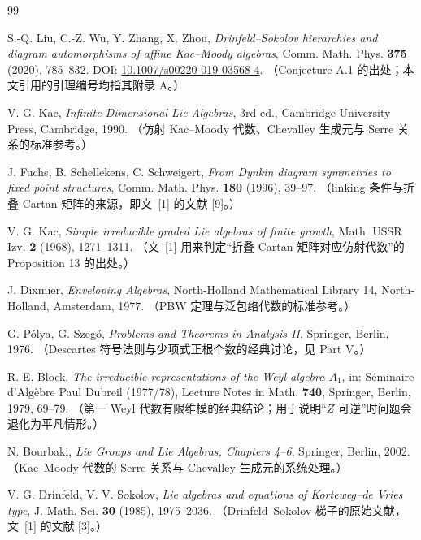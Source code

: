 \documentclass[11pt,UTF8]{ctexart}
\theoremstyle{definition}
\begin{document}
\begin{thebibliography}{99}

 S.-Q. Liu, C.-Z. Wu, Y. Zhang, X. Zhou,
\emph{Drinfeld--Sokolov hierarchies and diagram automorphisms of affine Kac--Moody algebras},
Comm. Math. Phys. \textbf{375} (2020), 785--832.
DOI: \href{https://doi.org/10.1007/s00220-019-03568-4}{10.1007/s00220-019-03568-4}.
（Conjecture A.1 的出处；本文引用的引理编号均指其附录 A。）

 V. G. Kac,
\emph{Infinite-Dimensional Lie Algebras}, 3rd ed., Cambridge University Press, Cambridge, 1990.
（仿射 Kac--Moody 代数、Chevalley 生成元与 Serre 关系的标准参考。）

 J. Fuchs, B. Schellekens, C. Schweigert,
\emph{From Dynkin diagram symmetries to fixed point structures},
Comm. Math. Phys. \textbf{180} (1996), 39--97.
（linking 条件与折叠 Cartan 矩阵的来源，即文~[1] 的文献 [9]。）

 V. G. Kac,
\emph{Simple irreducible graded Lie algebras of finite growth},
Math. USSR Izv. \textbf{2} (1968), 1271--1311.
（文~[1] 用来判定“折叠 Cartan 矩阵对应仿射代数”的 Proposition 13 的出处。）

 J. Dixmier,
\emph{Enveloping Algebras}, North-Holland Mathematical Library 14, North-Holland, Amsterdam, 1977.
（PBW 定理与泛包络代数的标准参考。）

 G. P\'olya, G. Szeg\H{o},
\emph{Problems and Theorems in Analysis II}, Springer, Berlin, 1976.
（Descartes 符号法则与少项式正根个数的经典讨论，见 Part V。）

 R. E. Block,
\emph{The irreducible representations of the Weyl algebra $A_1$},
in: S\'eminaire d'Alg\`ebre Paul Dubreil (1977/78), Lecture Notes in Math. \textbf{740},
Springer, Berlin, 1979, 69--79.
（第一 Weyl 代数有限维模的经典结论；用于说明“$Z$ 可逆”时问题会退化为平凡情形。）

 N. Bourbaki,
\emph{Lie Groups and Lie Algebras, Chapters 4--6}, Springer, Berlin, 2002.
（Kac--Moody 代数的 Serre 关系与 Chevalley 生成元的系统处理。）

 V. G. Drinfeld, V. V. Sokolov,
\emph{Lie algebras and equations of Korteweg--de Vries type},
J. Math. Sci. \textbf{30} (1985), 1975--2036.
（Drinfeld--Sokolov 梯子的原始文献，文~[1] 的文献 [3]。）

\end{thebibliography}
\end{document}
